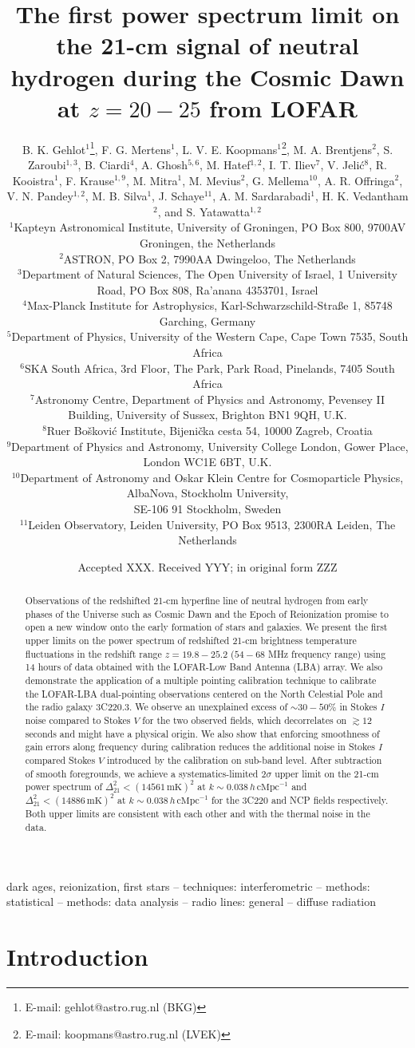 \documentclass[fleqn,usenatbib]{mnras}
\title[Cosmic Dawn power spectrum limit with LOFAR]{The first power spectrum limit on the 21-cm signal of neutral hydrogen during the Cosmic Dawn at $z=20-25$ from LOFAR}
\author[B. K. Gehlot et al.]{B. K. Gehlot$^{1}$\thanks{E-mail: gehlot@astro.rug.nl (BKG)}, F. G. Mertens$^{1}$, L. V. E. Koopmans$^{1}$\thanks{E-mail: koopmans@astro.rug.nl (LVEK)}, M. A. Brentjens$^{2}$, 
\newauthor S. Zaroubi$^{1,3}$, B. Ciardi$^{4}$, A. Ghosh$^{5,6}$, M. Hatef$^{1,2}$, I. T. Iliev$^{7}$, V. Jeli\'c$^{8}$,
\newauthor R. Kooistra$^{1}$, F. Krause$^{1,9}$, M. Mitra$^{1}$, M. Mevius$^{2}$, G. Mellema$^{10}$, A. R. Offringa$^{2}$,
\newauthor V. N. Pandey$^{1,2}$, M. B. Silva$^{1}$, J. Schaye$^{11}$, A. M. Sardarabadi$^{1}$, H. K. Vedantham$^{2}$,
\newauthor and S. Yatawatta$^{1,2}$
\\
$^{1}$Kapteyn Astronomical Institute, University of Groningen, PO Box 800, 9700AV Groningen, the Netherlands\\
$^{2}$ASTRON, PO Box 2, 7990AA Dwingeloo, The Netherlands\\
$^{3}$Department of Natural Sciences, The Open University of Israel, 1 University Road, PO Box 808, Ra'anana 4353701, Israel \\
$^{4}$Max-Planck Institute for Astrophysics, Karl-Schwarzschild-Stra{\ss}e 1, 85748 Garching, Germany\\
$^{5}$Department of Physics, University of the Western Cape, Cape Town 7535, South Africa \\
$^{6}$SKA South Africa, 3rd Floor, The Park, Park Road, Pinelands, 7405 South Africa\\
$^{7}$Astronomy Centre, Department of Physics and Astronomy, Pevensey II Building, University of Sussex, Brighton BN1 9QH, U.K.\\
$^{8}$Ru{\dj}er Bo\v{s}kovi\'{c} Institute, Bijeni\v{c}ka cesta 54, 10000 Zagreb, Croatia\\
$^{9}$Department of Physics and Astronomy, University College London, Gower Place, London WC1E 6BT, U.K. \\
$^{10}$Department of Astronomy and Oskar Klein Centre for Cosmoparticle Physics, AlbaNova, Stockholm University,\\ SE-106 91 Stockholm, Sweden\\
$^{11}$Leiden Observatory, Leiden University, PO Box 9513, 2300RA Leiden, The Netherlands
}
\date{Accepted XXX. Received YYY; in original form ZZZ}
\begin{document}
\label{firstpage}
\pagerange{\pageref{firstpage}--\pageref{lastpage}}
\maketitle

\begin{abstract}
Observations of the redshifted 21-cm hyperfine line of neutral hydrogen from early phases of the Universe such as Cosmic Dawn and the Epoch of Reionization promise to open a new window onto the early formation of stars and galaxies. We present the first upper limits on the power spectrum of redshifted 21-cm brightness temperature fluctuations in the redshift range $z = 19.8 - 25.2$ ($54-68$ MHz frequency range) using 14 hours of data obtained with the LOFAR-Low Band Antenna (LBA) array. We also demonstrate the application of a multiple pointing calibration technique to calibrate the LOFAR-LBA dual-pointing observations centered on the North Celestial Pole and the radio galaxy 3C220.3. We observe an unexplained excess of $\sim 30-50\%$ in Stokes $I$ noise compared to Stokes $V$ for the two observed fields, which decorrelates on $\gtrsim 12$ seconds and might have a physical origin. We also show that enforcing smoothness of gain errors along frequency during calibration reduces the additional noise in Stokes $I$ compared Stokes $V$ introduced by the calibration on sub-band level. After subtraction of smooth foregrounds, we achieve a systematics-limited $2\sigma$ upper limit on the 21-cm power spectrum of $\Delta_{21}^2 < (14561\,\text{mK})^2$ at $k\sim 0.038\,h\,\text{cMpc}^{-1}$ and $\Delta_{21}^2 < (14886\,\text{mK})^2$ at $k\sim 0.038 \,h\,\text{cMpc}^{-1}$ for the 3C220 and NCP fields respectively. Both upper limits are consistent with each other and with the thermal noise in the data. 
\end{abstract}

\begin{keywords}
 dark ages, reionization, first stars -- techniques: interferometric -- methods: statistical -- methods: data analysis -- radio lines: general --  diffuse radiation 
\end{keywords}


\section{Introduction}\label{introduction}
\end{document}
